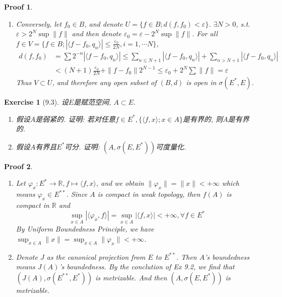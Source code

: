 \documentclass[hyperref,UTF8]{ctexart}
\newtheorem{ex}{Exercise}[section]
\newtheorem{pf}{Proof}[section]
\newcommand{\lrangle}[2]{\langle #1, #2 \rangle}
\begin{document}
\begin{pf}
\begin{enumerate}
\begin{enumerate}
            \item Conversely, let $f_0\in B$, and denote $U = \{ f\in B; d(f, f_0) < \varepsilon\}$. $\exists N > 0$, s.t. $\varepsilon > 2^N\sup\|f\|$ and then denote $\varepsilon_0 = \varepsilon - 2^N\sup\|f\|$. For all $f\in V = \{f\in B; |\lrangle{f-f_0}{q_n}|\leq \frac{\varepsilon_0}{2N}, i = 1, \cdots N\}$, 
            \[ \begin{aligned}
                d(f, f_0) &= \sum2^{-n} |\lrangle{f-f_0}{q_n}| \leq \sum_{n \leq N+1} |\lrangle{f-f_0}{q_n}| +  \sum_{n > N+1}|\lrangle{f-f_0}{q_n}|\\
                &< (N+1) \frac{\varepsilon_0}{2N} + \|f - f_0\| 2^{N-1}\leq \varepsilon_0 + 2^N\sum\|f\|=\varepsilon  
            \end{aligned}\]
            Thus $V\subset U$, and therefore any open subset of $(B, d)$ is open in $\sigma(E^*, E)$.  
        \end{enumerate}
    \end{enumerate}
\end{pf}\newpage

\begin{ex}[9.3]
    设$E$是赋范空间, $A\subset E$. \begin{enumerate}
        \item 假设$A$是弱紧的. 证明: 若对任意$f\in E^*, \{\lrangle{f}{x}; x\in A\}$是有界的, 则$A$是有界的. 
        \item 假设$A$有界且$E^*$可分. 证明: $(A, \sigma(E, E^*))$可度量化. 
    \end{enumerate}
\end{ex}
\begin{pf}
    \begin{enumerate}
        \item Let $\varphi_x : E^*\to \mathbb R,f\mapsto \lrangle{f}{x}$, and we obtain $\|\varphi_x\| = \|x\| < +\infty$ which means $\varphi_x\in E^{**}$. Since $A$ is compact in weak topology, then $f(A)$ is compact in $\mathbb R$ and 
        \[ \sup_{x\in A}|\lrangle{\varphi_x}{f}| = \sup_{x\in A} |\lrangle{f}{x}| < +\infty, \forall f \in E^* \]
        By Uniform Boundedness Principle, we have $\sup_{x\in A}\|x\| = \sup_{x\in A} \|\varphi_x\| < +\infty$. 
        \item Denote $J$ as the canonical projection from $E$ to $E^{**}$. Then $A$'s boundedness means $J(A)$'s boundedness. By the conclution of Ex 9.2, we find that $(J(A), \sigma(E^{**}, E^{*}))$ is metrizable. And then $(A, \sigma(E, E^*))$ is metrizable. 
    \end{enumerate}
\end{pf}
\end{document}

